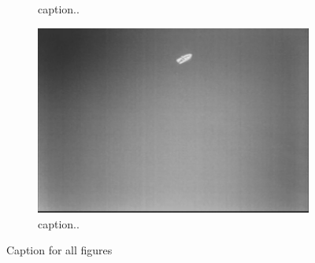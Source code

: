 \begin{figure}[ht]
\begin{subfigure}[b]{0.45\textwidth}
		\caption{caption..}
		\label{fig:2c}
	\end{subfigure}
	\begin{subfigure}[b]{0.45\textwidth}
		\includegraphics[width=\textwidth]{fig1}
		\caption{caption..}
		\label{fig:2d}
	\end{subfigure}
	\caption{Caption for all figures}\label{fig:2}
\end{figure}




